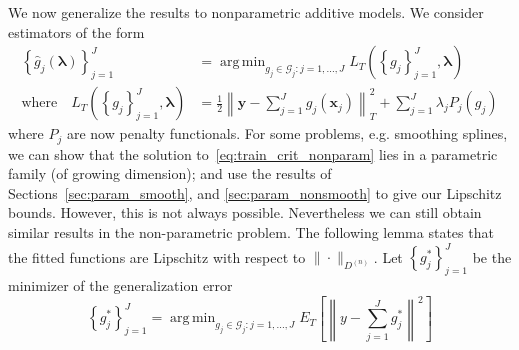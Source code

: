 \documentclass[12pt]{article}
\DeclareMathOperator*{\argmin}{arg\,min}
\begin{document}
We now generalize the results to nonparametric additive models. We consider estimators of the form
\begin{align}
\label{eq:train_crit_nonparam}
\left\{ \hat{g}_j( \boldsymbol \lambda) \right \}_{j=1}^J &= 
\argmin_{g_j\in \mathcal{G}_j: j=1,...,J}  L_T\left (\left \{ g_j \right \}_{j=1}^J, \boldsymbol{\lambda} \right ) \\
\text{where} \quad L_T \left (\left \{ g_j \right \}_{j=1}^J, \boldsymbol{\lambda} \right ) &=
\frac{1}{2} \left \| \boldsymbol y -  \sum_{j=1}^J g_j(\boldsymbol x_j) \right \|^2_T 
+ \sum_{j=1}^J \lambda_j P_j(g_j)
\end{align}
where $P_j$ are now penalty functionals. For some problems, e.g. smoothing splines, we can show that the solution to~\eqref{eq:train_crit_nonparam} lies in a parametric family (of growing dimension); and use the results of Sections~\ref{sec:param_smooth}, and \ref{sec:param_nonsmooth} to give our Lipschitz bounds. However, this is not always possible. Nevertheless we can still obtain similar results in the non-parametric problem. The following lemma states that the fitted functions are Lipschitz with respect to $\| \cdot \|_{D^{(n)}}$. Let $\left\{ g_j^* \right \}_{j=1}^J$ be the minimizer of the generalization error
\begin{equation}
\left\{ g_j^* \right \}_{j=1}^J = \argmin_{g_j \in \mathcal{G}_j: j=1,...,J} E_T\left[ \left \| y - \sum_{j=1}^J g_j^* \right \|^2 \right]
\end{equation}
\end{document}

